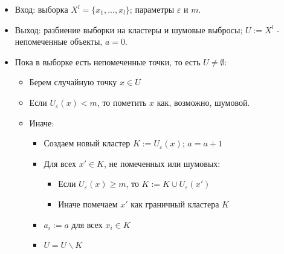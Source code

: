 \begin{itemize}
    \item Вход: выборка $X^{l} = \{ x_1, ..., x_l\}$; параметры $\varepsilon$ и $m$.
    \item Выход: разбиение выборки на кластеры и шумовые выбросы; $U := X^{l}$ - непомеченные объекты, $a = 0$.
    \item Пока в выборке есть непомеченные точки, то есть $U \neq \emptyset$:
    \begin{itemize}
        \item Берем случайную точку $x \in U$
        \item Если $U_{\varepsilon}(x) < m$, то пометить $x$ как, возможно, шумовой.
        \item Иначе:
        \begin{itemize}
            \item Создаем новый кластер $K := U_{\varepsilon}(x)$; $a = a + 1$
            \item Для всех $x' \in K$, не помеченных или шумовых:
            \begin{itemize}
                \item Если $U_{\varepsilon}(x) \geq m$, то $K := K \cup U_{\varepsilon}(x')$
                \item Иначе помечаем $x'$ как граничный кластера $K$ 
            \end{itemize}
            \item $a_i := a$ для всех $x_i \in K$
            \item $U = U \backslash K$
        \end{itemize}
    \end{itemize}
\end{itemize}
